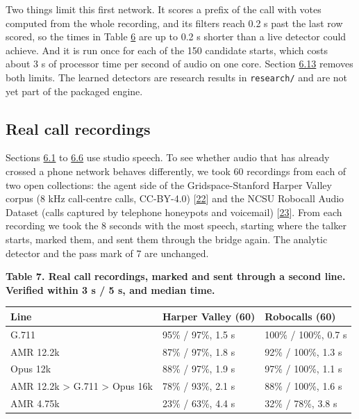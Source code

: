 \documentclass[10pt,a4paper]{article}
\begin{document}
Two things limit this first network. It scores a prefix of the call with votes computed from the whole recording, and its filters reach 0.2 s past the last row scored, so the times in Table \hyperref[t-6]{6} are up to 0.2 s shorter than a live detector could achieve. And it is run once for each of the 150 candidate starts, which costs about 3 s of processor time per second of audio on one core. Section \hyperref[s-6-13]{6.13} removes both limits. The learned detectors are research results in \texttt{research/} and are not yet part of the packaged engine.

\subsection{Real call recordings}\label{s-6-7}

Sections \hyperref[s-6-1]{6.1} to \hyperref[s-6-6]{6.6} use studio speech. To see whether audio that has already crossed a phone network behaves differently, we took 60 recordings from each of two open collections: the agent side of the Gridspace-Stanford Harper Valley corpus (8 kHz call-centre calls, CC-BY-4.0) {[}\hyperlink{ref-22}{22}{]} and the NCSU Robocall Audio Dataset (calls captured by telephone honeypots and voicemail) {[}\hyperlink{ref-23}{23}{]}. From each recording we took the 8 seconds with the most speech, starting where the talker starts, marked them, and sent them through the bridge again. The analytic detector and the pass mark of 7 are unchanged.

\begin{center}\small {}\label{t-7}\textbf{Table 7. Real call recordings, marked and sent through a second line. Verified within 3 s / 5 s, and median time.}\end{center}

{\def\LTcaptype{none} %
\begin{longtable}[]{@{}lll@{}}
\toprule\noalign{}
Line & Harper Valley (60) & Robocalls (60) \\
\midrule\noalign{}
\endhead
\bottomrule\noalign{}
\endlastfoot
G.711 & 95\% / 97\%, 1.5 s & 100\% / 100\%, 0.7 s \\
AMR 12.2k & 87\% / 97\%, 1.8 s & 92\% / 100\%, 1.3 s \\
Opus 12k & 88\% / 97\%, 1.9 s & 97\% / 100\%, 1.1 s \\
AMR 12.2k \textgreater{} G.711 \textgreater{} Opus 16k & 78\% / 93\%, 2.1 s & 88\% / 100\%, 1.6 s \\
AMR 4.75k & 23\% / 63\%, 4.4 s & 32\% / 78\%, 3.8 s \\
\end{longtable}
}
\end{document}
